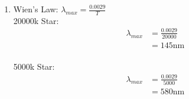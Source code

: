 \documentclass{article}
\begin{document}
\begin{enumerate}
\begin{enumerate}
        \item
        
        Wien's Law: $\lambda_{max}=\frac{0.0029}{T}$\\
        20000k Star:\\
        \begin{align*}
            \lambda_{max} &= \frac{0.0029}{20000}\\
            &= 145 \text{nm}
        \end{align*}\\
        5000k Star:
        \begin{align*}
            \lambda_{max} &= \frac{0.0029}{5000}\\
            &= 580 \text{nm}
        \end{align*}
        
    \end{enumerate}
    
\end{enumerate}
\end{document}
